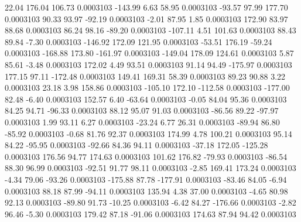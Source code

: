       22.04      176.04      106.73     0.0003103
     -143.99        6.63       58.95     0.0003103
      -93.57       97.99      177.70     0.0003103
       90.33       93.97      -92.19     0.0003103
       -2.01       87.95        1.85     0.0003103
      172.90       83.97       88.68     0.0003103
       86.24       98.16      -89.20     0.0003103
     -107.11        4.51      101.63     0.0003103
       88.43       89.84       -7.30     0.0003103
     -146.92      172.09      121.95     0.0003103
      -53.51      176.19      -59.24     0.0003103
     -168.88      173.80     -161.97     0.0003103
     -149.04      178.09      124.61     0.0003103
        5.87       85.61       -3.48     0.0003103
      172.02        4.49       93.51     0.0003103
       91.14       94.49     -175.97     0.0003103
      177.15       97.11     -172.48     0.0003103
      149.41      169.31       58.39     0.0003103
       89.23       90.88        3.22     0.0003103
       23.18        3.98      158.86     0.0003103
     -105.10      172.10     -112.58     0.0003103
     -177.00       82.48       -6.40     0.0003103
      152.57        6.40      -63.64     0.0003103
       -0.05       84.04       95.36     0.0003103
       84.25       94.71      -96.33     0.0003103
       88.12       95.07       91.03     0.0003103
      -86.56       89.22      -97.97     0.0003103
        1.99       93.11        6.27     0.0003103
      -23.24        6.77       26.31     0.0003103
      -89.94       86.80      -85.92     0.0003103
       -0.68       81.76       92.37     0.0003103
      174.99        4.78      100.21     0.0003103
       95.14       84.22      -95.95     0.0003103
      -92.66       84.36       94.11     0.0003103
      -37.18      172.05     -125.28     0.0003103
      176.56       94.77      174.63     0.0003103
      101.62      176.82      -79.93     0.0003103
      -86.54       88.30       96.99     0.0003103
      -92.51       91.77       98.11     0.0003103
       -2.85      169.41      173.24     0.0003103
       -4.34       79.06      -93.26     0.0003103
     -175.88       87.78     -177.91     0.0003103
      -83.46       84.05       -6.94     0.0003103
       88.18       87.99      -94.11     0.0003103
      135.94        4.38       37.00     0.0003103
       -4.65       80.98       92.13     0.0003103
      -89.80       91.73      -10.25     0.0003103
       -6.42       84.27     -176.66     0.0003103
       -2.82       96.46       -5.30     0.0003103
      179.42       87.18      -91.06     0.0003103
      174.63       87.94       94.42     0.0003103
